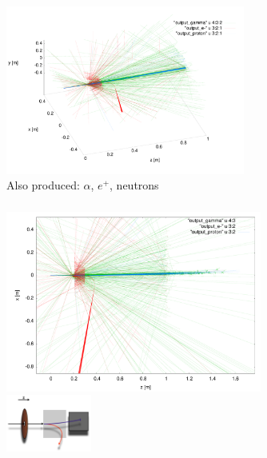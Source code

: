 \documentclass{beamer}
\newcommand{\ident}{\thesection.\thesubsection}
\newcommand{\ftitle}{\frametitle{\nameref{\ident}}}
\begin{document}
\begin{frame}
	\ftitle
	\begin{figure}
		\includegraphics[width=0.7\textwidth]{img/beamline_traj_3d}
		\caption{Also produced: $\alpha$, $e^+$, neutrons}
	\end{figure}
\end{frame}

\begin{frame}
	\ftitle
	\begin{figure}
		\includegraphics[width=0.75\textwidth]{img/beamline_traj_overview}~
		\includegraphics[width=0.25\textwidth]{img/beamline_setup}
	\end{figure}
\end{frame}
\end{document}
